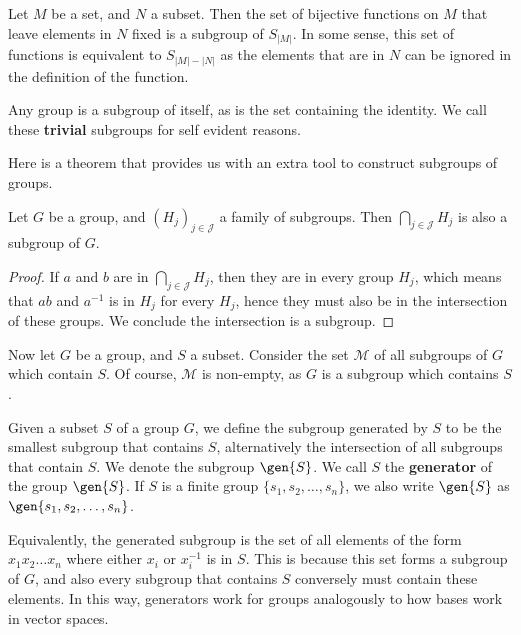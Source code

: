 \begin{example}
    Let $M$ be a set, and $N$ a subset. Then the set of bijective functions on $M$ that leave elements in $N$ fixed is a subgroup of $S_{|M|}$. In some sense, this set of functions is equivalent to $S_{|M| - |N|}$ as the elements that are in $N$ can be ignored in the definition of the function.
\end{example}

\begin{example}
    Any group is a subgroup of itself, as is the set containing the identity. We call these {\bf trivial} subgroups for self evident reasons.
\end{example}

Here is a theorem that provides us with an extra tool to construct subgroups of groups.

\begin{lemma}
    Let $G$ be a group, and $(H_j)_{j \in \mathcal{J}}$ a family of subgroups. Then $\bigcap_{j \in \mathcal{J}} H_j$ is also a subgroup of $G$.
\end{lemma}
\begin{proof}
    If $a$ and $b$ are in $\bigcap_{j \in \mathcal{J}} H_j$, then they are in every group $H_j$, which means that $ab$ and $a^{-1}$ is in $H_j$ for every $H_j$, hence they must also be in the intersection of these groups. We conclude the intersection is a subgroup.
\end{proof}

Now let $G$ be a group, and $S$ a subset. Consider the set $\mathcal{M}$ of all subgroups of $G$ which contain $S$. Of course, $\mathcal{M}$ is non-empty, as $G$ is a subgroup which contains $S$.

\begin{definition}
    Given a subset $S$ of a group $G$, we define the subgroup generated  by $S$ to be the smallest subgroup that contains $S$, alternatively the intersection of all subgroups that contain $S$. We denote the subgroup $\gen{S}$. We call $S$ the {\bf generator} of the group $\gen{S}$. If $S$ is a finite group $\{ s_1, s_2, \dots, s_n \}$, we also write $\gen{S}$ as $\gen{s_1, s_2, \dots, s_n}$.
\end{definition}

Equivalently, the generated subgroup is the set of all elements of the form $x_1 x_2 \dots x_n$ where either $x_i$ or $x_i^{-1}$ is in $S$. This is because this set forms a subgroup of $G$, and also every subgroup that contains $S$ conversely must contain these elements. In this way, generators work for groups analogously to how bases work in vector spaces.

